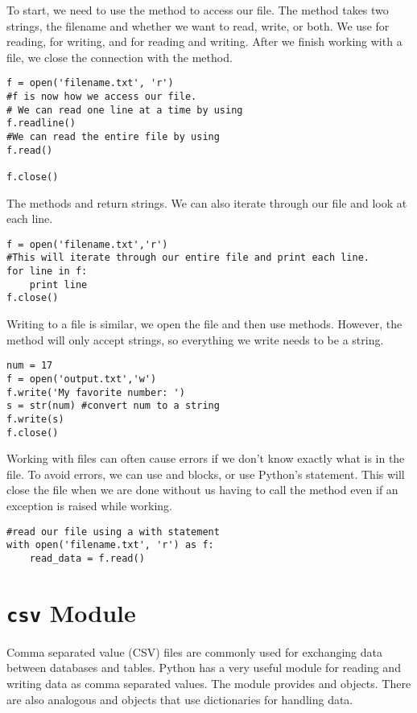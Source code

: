 To start, we need to use the  method to access our file.
The method takes two strings, the filename and whether we want to read, write, or both.
We use  for reading,  for writing, and  for reading and writing.
After we finish working with a file, we close the connection with the  method.

\begin{lstlisting}
f = open('filename.txt', 'r')
#f is now how we access our file.
# We can read one line at a time by using
f.readline()
#We can read the entire file by using
f.read()

f.close()
\end{lstlisting}

The methods  and  return strings.
We can also iterate through our file and look at each line.

\begin{lstlisting}
f = open('filename.txt','r')
#This will iterate through our entire file and print each line.
for line in f:
	print line
f.close()
\end{lstlisting}

Writing to a file is similar, we open the file and then use methods. 
However, the  method will only accept strings, so everything we write needs to be a string.

\begin{lstlisting}
num = 17
f = open('output.txt','w')
f.write('My favorite number: ')
s = str(num) #convert num to a string
f.write(s)
f.close()
\end{lstlisting}

Working with files can often cause errors if we don't know exactly what is in the file.
To avoid errors, we can use  and  blocks, or use Python's  statement.
This will close the file when we are done without us having to call the  method even if an exception is raised while working.

\begin{lstlisting}
#read our file using a with statement
with open('filename.txt', 'r') as f:
	read_data = f.read()
\end{lstlisting}



\section*{\texttt{csv} Module}
Comma separated value (CSV) files are commonly used for exchanging data between databases and tables. 
Python has a very useful module for reading and writing data as comma separated values.
The  module provides  and  objects.
There are also analogous  and  objects that use dictionaries for handling data.

